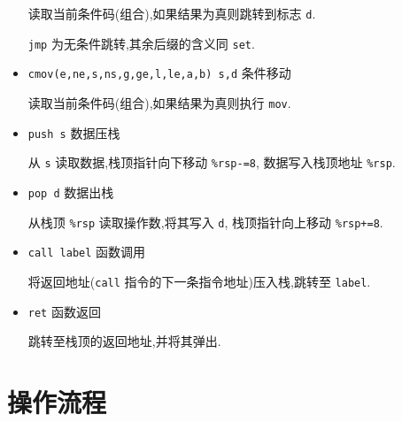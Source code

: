 \begin{itemize}
                读取当前条件码(组合),如果结果为真则跳转到标志 \texttt{d}.
                
                \texttt{jmp} 为无条件跳转,其余后缀的含义同 \texttt{set}.
            \item \texttt{cmov(e,ne,s,ns,g,ge,l,le,a,b)   s,d} 条件移动

                读取当前条件码(组合),如果结果为真则执行 \texttt{mov}.
            \item \texttt{push  s} 数据压栈

                从 \texttt{s} 读取数据,栈顶指针向下移动 \texttt{\%rsp-=8}, 数据写入栈顶地址 \texttt{\%rsp}.
            \item \texttt{pop   d} 数据出栈

                从栈顶 \texttt{\%rsp} 读取操作数,将其写入 \texttt{d}, 栈顶指针向上移动 \texttt{\%rsp+=8}.
            \item \texttt{call  label} 函数调用

                将返回地址(\texttt{call} 指令的下一条指令地址)压入栈,跳转至 \texttt{label}.
            \item \texttt{ret} 函数返回

                跳转至栈顶的返回地址,并将其弹出.
        \end{itemize}
    \section{操作流程}
